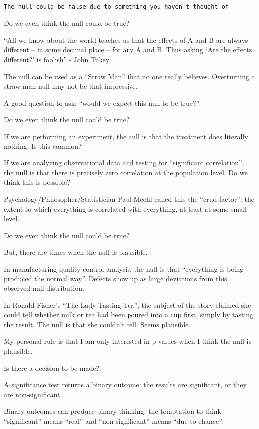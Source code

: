 \documentclass[
  letterpaper,
  DIV=11,
  numbers=noendperiod]{scrreprt}
\begin{document}
~

\begin{verbatim}
The null could be false due to something you haven't thought of
\end{verbatim}

Do we even think the null could be true?

``All we know about the world teaches us that the effects of A and B are
always different -- in some decimal place -- for any A and B. Thus
asking `Are the effects different?' is foolish''- John Tukey

The null can be used as a ``Straw Man'' that no one really believes.
Overturning a straw man null may not be that impressive.

A good question to ask: ``would we expect this null to be true?''

Do we even think the null could be true?

If we are performing an experiment, the null is that the treatment does
literally nothing. Is this common?

If we are analyzing observational data and testing for ``significant
correlation'', the null is that there is precisely zero correlation at
the population level. Do we think this is possible?

Psychology/Philosopher/Statistician Paul Meehl called this the ``crud
factor'': the extent to which everything is correlated with everything,
at least at some small level.

Do we even think the null could be true?

But, there are times when the null is plausible.

In manufacturing quality control analysis, the null is that ``everything
is being produced the normal way''. Defects show up as large deviations
from this observed null distribution.

In Ronald Fisher's ``The Lady Tasting Tea'', the subject of the story
claimed she could tell whether milk or tea had been poured into a cup
first, simply by tasting the result. The null is that she couldn't tell.
Seems plausible.

My personal rule is that I am only interested in p-values when I think
the null is plausible.

Is there a decision to be made?

A significance test returns a binary outcome: the results are
significant, or they are non-significant.

Binary outcomes can produce binary thinking: the temptation to think
``significant'' means ``real'' and ``non-significant'' means ``due to
chance''.
\end{document}

